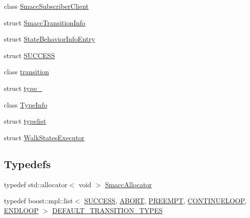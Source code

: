 \begin{DoxyCompactItemize}
\item 
class \hyperlink{classsmacc_1_1SmaccSubscriberClient}{Smacc\+Subscriber\+Client}
\item 
struct \hyperlink{structsmacc_1_1SmaccTransitionInfo}{Smacc\+Transition\+Info}
\item 
struct \hyperlink{structsmacc_1_1StateBehaviorInfoEntry}{State\+Behavior\+Info\+Entry}
\item 
struct \hyperlink{structsmacc_1_1SUCCESS}{S\+U\+C\+C\+E\+SS}
\item 
class \hyperlink{classsmacc_1_1transition}{transition}
\item 
struct \hyperlink{structsmacc_1_1type__}{type\+\_\+}
\item 
class \hyperlink{classsmacc_1_1TypeInfo}{Type\+Info}
\item 
struct \hyperlink{structsmacc_1_1typelist}{typelist}
\item 
struct \hyperlink{structsmacc_1_1WalkStatesExecutor}{Walk\+States\+Executor}
\end{DoxyCompactItemize}
\subsection*{Typedefs}
\begin{DoxyCompactItemize}
\item 
typedef std\+::allocator$<$ void $>$ \hyperlink{namespacesmacc_ac43548af6721e408234339fcf1ab1254}{Smacc\+Allocator}
\item 
typedef boost\+::mpl\+::list$<$ \hyperlink{structsmacc_1_1SUCCESS}{S\+U\+C\+C\+E\+SS}, \hyperlink{structsmacc_1_1ABORT}{A\+B\+O\+RT}, \hyperlink{structsmacc_1_1PREEMPT}{P\+R\+E\+E\+M\+PT}, \hyperlink{structsmacc_1_1CONTINUELOOP}{C\+O\+N\+T\+I\+N\+U\+E\+L\+O\+OP}, \hyperlink{structsmacc_1_1ENDLOOP}{E\+N\+D\+L\+O\+OP} $>$ \hyperlink{namespacesmacc_a5238572f5e2747391ba919540aaf70bd}{D\+E\+F\+A\+U\+L\+T\+\_\+\+T\+R\+A\+N\+S\+I\+T\+I\+O\+N\+\_\+\+T\+Y\+P\+ES}
\end{DoxyCompactItemize}

